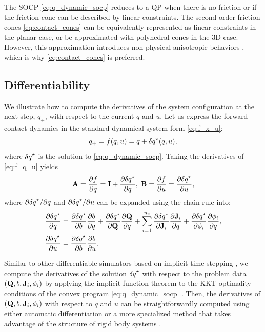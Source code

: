 The SOCP \eqref{eq:q_dynamic_socp} reduces to a QP when there is no friction or if the friction cone can be described by linear constraints. The second-order friction cones \eqref{eq:contact_cones} can be equivalently represented as linear constraints in the planar case, or be approximated with polyhedral cones \cite{stewart2000rigid} in the 3D case. However, this approximation introduces non-physical anisotropic behaviors \cite{li2018implicit, howell2022dojo}, which is why \eqref{eq:contact_cones} is preferred.

\subsection{Differentiability} \label{sec:quasi_dynamic_derivatives}
We illustrate how to compute the derivatives of the system configuration at the next step, $q_+$, with respect to the current $q$ and $u$. Let us express the forward contact dynamics in the standard dynamical system form \eqref{eq:f_x_u}:
\begin{equation}
\label{eq:f_q_u}
q_+ = f(q, u) = q + {\delta q}^\star(q, u),
\end{equation}
where ${\delta q}^\star$ is the solution to  \eqref{eq:q_dynamic_socp}. Taking the derivatives of \eqref{eq:f_q_u} yields
\begin{equation}
\label{eq:q_dynamics_AB}
\mathbf{A} = \frac{\partial {f}}{\partial {q}} = \mathbf{I} + \frac{\partial {{\delta q}^\star}}{\partial {q}}, \;
\mathbf{B} = \frac{\partial {f}}{\partial {u}} = \frac{\partial {{\delta q}^\star}}{\partial {u}},
\end{equation}
where $\partial {{\delta q}^\star} / \partial {q}$ and $\partial {{\delta q}^\star} / \partial {u}$ can be expanded using the chain rule into:
\begin{subequations}
\label{eq:dq_star_q_u}
\begin{align}
\frac{\partial {{\delta q}^\star}}{\partial {q}} &= \frac{\partial {{\delta q}^\star}}{\partial {b}} \frac{\partial {b}}{\partial {q}} + \frac{\partial {{\delta q}^\star}}{\partial {\mathbf{Q}}}\frac{\partial {\mathbf{Q}}}{\partial {q}} + \sum_{i=1}^{n_\mathrm{c}} \frac{\partial {{\delta q}^\star}}{\partial {\mathbf{J}_i}}\frac{\partial {\mathbf{J}_i}}{\partial {q}} + \frac{\partial {{\delta q}^\star}}{\partial {\phi_i}}\frac{\partial {\phi_i}}{\partial {q}}, \label{eq:DdqDq}\\
\frac{\partial {{\delta q}^\star}}{\partial {u}} &= \frac{\partial {{\delta q}^\star}}{\partial {b}} \frac{\partial {b}}{\partial {u}}. \label{eq:DdqDu}
\end{align}
\end{subequations}

Similar to other differentiable simulators based on implicit time-stepping \cite{werling2021fast, howell2022dojo}, we compute the derivatives of the solution ${\delta q}^\star$ with respect to the problem data $(\mathbf{Q}, b, \mathbf{J}_i, \phi_i)$ by applying the implicit function theorem to the KKT optimality conditions of the convex program \eqref{eq:q_dynamic_socp} \cite{agrawal2019differentiatingcone}. 
Then, the derivatives of $(\mathbf{Q}, b, \mathbf{J}_i, \phi_i)$ with respect to $q$ and $u$ can be straightforwardly computed using either automatic differentiation or a more specialized method that takes advantage of the structure of rigid body systems \cite{carpentier2018analytical}.

